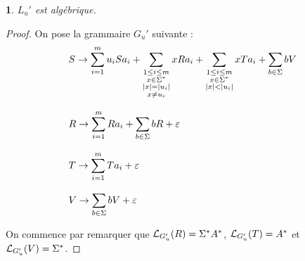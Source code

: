 \documentclass[10pt,a4paper,notitlepage]{article}
\theoremstyle{plain}
\theoremstyle{definition}
\theoremstyle{definition}
\theoremstyle{remark}
\theoremstyle{remark}
\theoremstyle{plain}
\newtheorem{lem}[thm]{\protect\lemmaname}
\theoremstyle{plain}
\theoremstyle{plain}
\theoremstyle{remark}
\providecommand{\lemmaname}{Lemme}
\begin{document}
\begin{lem}
	$L_u'$ est algébrique.
\end{lem}

\begin{proof}
	On pose la grammaire $G_u'$ suivante :
	\[\begin{array}{l}
	\displaystyle S\to \sum_{i=1}^mu_iSa_i + \sum_{\substack{1\le i \le m\\x\in\Sigma^*\\ \left|x\right|=\left|u_i\right|\\x\not=u_i}}xRa_i+\sum\limits_{\substack{1\le i\le m\\x\in\Sigma^*\\\left|x\right|<\left|u_i\right|}}xTa_i+\sum\limits_{b\in \Sigma}bV\\\\
	\displaystyle R\to \sum_{i=1}^mRa_i+\sum_{b\in\Sigma}bR+\varepsilon\\\\
	\displaystyle T\to \sum_{i=1}^mTa_i+\varepsilon\\\\
	\displaystyle V\to \sum_{b\in\Sigma}bV+\varepsilon
	\end{array}\]
	
	On commence par remarquer que $\mathcal{L}_{G_u'}(R)=\Sigma^*A^*$, $\mathcal{L}_{G_u'}(T)=A^*$ et $\mathcal{L}_{G_u'}(V)=\Sigma^*$.
	

\end{proof}
\end{document}
